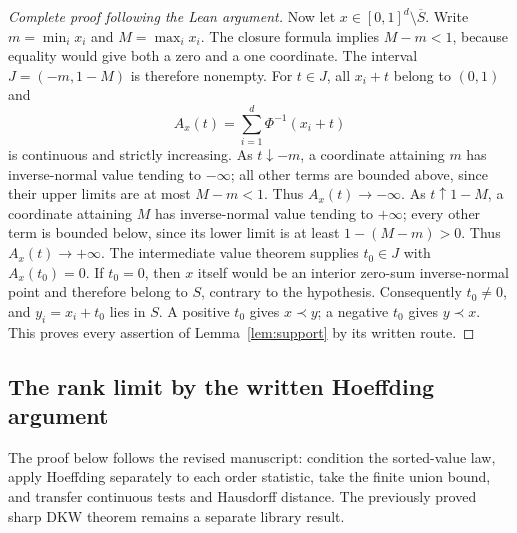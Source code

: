 \begin{proof}[Complete proof following the Lean argument]
Now let $x\in[0,1]^d\setminus\overline S$.
Write $m=\min_i x_i$ and $M=\max_i x_i$.
The closure formula implies $M-m<1$, because equality would give both a
zero and a one coordinate. The interval $J=(-m,1-M)$ is therefore nonempty.
For $t\in J$, all $x_i+t$ belong to $(0,1)$ and
\[
 A_x(t)=\sum_{i=1}^d\Phi^{-1}(x_i+t)
\]
is continuous and strictly increasing.
As $t\downarrow-m$, a coordinate attaining $m$ has inverse-normal value
tending to $-\infty$; all other terms are bounded above, since their upper
limits are at most $M-m<1$. Thus $A_x(t)\to-\infty$.
As $t\uparrow1-M$, a coordinate attaining $M$ has inverse-normal value
tending to $+\infty$; every other term is bounded below, since its lower
limit is at least $1-(M-m)>0$. Thus $A_x(t)\to+\infty$.
The intermediate value theorem supplies $t_0\in J$ with $A_x(t_0)=0$.
If $t_0=0$, then $x$ itself would be an interior zero-sum inverse-normal
point and therefore belong to $S$, contrary to the hypothesis.
Consequently $t_0\ne0$, and
$y_i=x_i+t_0$ lies in $S$. A positive $t_0$ gives $x\prec y$; a negative
$t_0$ gives $y\prec x$.
This proves every assertion of Lemma~\ref{lem:support} by its written route.
\end{proof}

\subsection{The rank limit by the written Hoeffding argument}
\label{leanproof:ANT-6-1}

The proof below follows the revised manuscript: condition the sorted-value
law, apply Hoeffding separately to each order statistic, take the finite
union bound, and transfer continuous tests and Hausdorff distance. The
previously proved sharp DKW theorem remains a separate library result.

